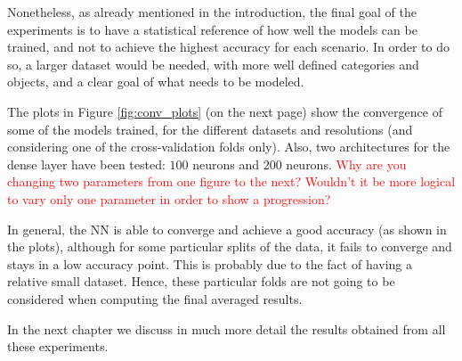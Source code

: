 Nonetheless, as already mentioned in the introduction, the final goal of the experiments is to have a statistical reference of how well the models can be trained, and not to achieve the highest accuracy for each scenario. In order to do so, a larger dataset would be needed, with more well defined categories and objects, and a clear goal of what needs to be modeled.

The plots in Figure \ref{fig:conv_plots} (on the next page) show the convergence of some of the models trained, for the different datasets and resolutions (and considering one of the cross-validation folds only). Also, two architectures for the dense layer have been tested: $100$ neurons and $200$ neurons. \textcolor{red}{Why are you changing two parameters from one figure to the next? Wouldn't it be more logical to vary only one parameter in order to show a progression?}

In general, the NN is able to converge and achieve a good accuracy (as shown in the plots), although for some particular splits of the data, it fails to converge and stays in a low accuracy point. This is probably due to the fact of having a relative small dataset. Hence, these particular folds are not going to be considered when computing the final averaged results.

In the next chapter we discuss in much more detail the results obtained from all these experiments.

